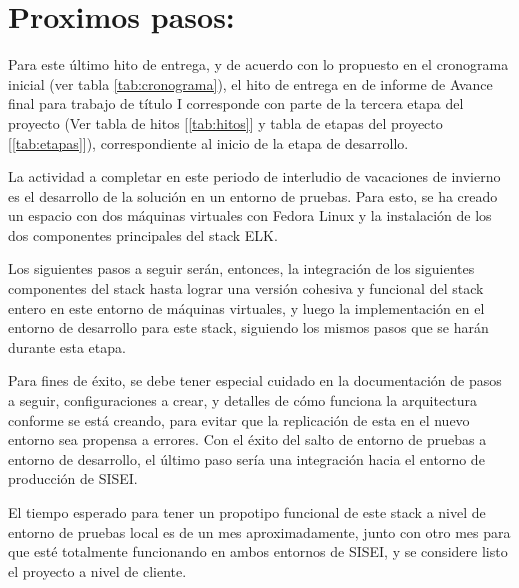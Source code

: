 \section{Proximos pasos:}

Para este último hito de entrega, y de acuerdo con lo propuesto en el cronograma inicial (ver tabla \ref{tab:cronograma}), el hito de entrega en de informe de Avance final para trabajo de título I corresponde con parte de la tercera etapa del proyecto (Ver tabla de hitos [\ref{tab:hitos}] y tabla de etapas del proyecto [\ref{tab:etapas}]), correspondiente al inicio de la etapa de desarrollo.

La actividad a completar en este periodo de interludio de vacaciones de invierno es el desarrollo de la solución en un entorno de pruebas. Para esto, se ha creado un espacio con dos máquinas virtuales con Fedora Linux y la instalación de los dos componentes principales del stack ELK.

Los siguientes pasos a seguir serán, entonces, la integración de los siguientes componentes del stack hasta lograr una versión cohesiva y funcional del stack entero en este entorno de máquinas virtuales, y luego la implementación en el entorno de desarrollo para este stack, siguiendo los mismos pasos que se harán durante esta etapa.

Para fines de éxito, se debe tener especial cuidado en la documentación de pasos a seguir, configuraciones a crear, y detalles de cómo funciona la arquitectura conforme se está creando, para evitar que la replicación de esta en el nuevo entorno sea propensa a errores. Con el éxito del salto de entorno de pruebas a entorno de desarrollo, el último paso sería una integración hacia el entorno de producción de SISEI.

El tiempo esperado para tener un propotipo funcional de este stack a nivel de entorno de pruebas local es de un mes aproximadamente, junto con otro mes para que esté totalmente funcionando en ambos entornos de SISEI, y se considere listo el proyecto a nivel de cliente.

\clearpage
